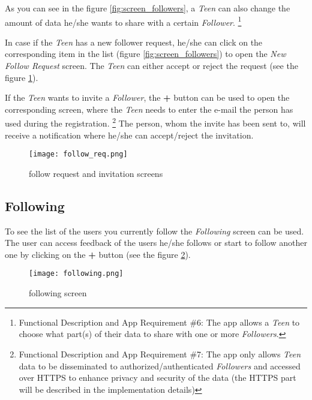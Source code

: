\documentclass{article}
\begin{document}
    As you can see in the figure \ref{fig:screen_followers}, a \emph{Teen} can also change the amount of data he/she wants to share with a certain \emph{Follower}.
    \footnote{Functional Description and App Requirement \#6: The app allows a \emph{Teen} to choose what part(s) of their data to share with one or more \emph{Followers}.}

\newpage

In case if the \emph{Teen} has a new follower request, he/she can click on the corresponding item in the list (figure \ref{fig:screen_followers}) to open the \emph{New Follow Request} screen. The \emph{Teen} can  either accept or reject the request (see the figure \ref{fig:screen_follow_req}).
    
    If the \emph{Teen} wants to invite a \emph{Follower}, the \textbf{+} button can be used to open the corresponding screen, where the \emph{Teen} needs to enter the e-mail the person has used during the registration.
    \footnote{Functional Description and App Requirement \#7: The app only allows \emph{Teen} data to be disseminated to authorized/authenticated \emph{Followers} and accessed over HTTPS to enhance privacy and security of the data (the HTTPS part will be described in the implementation details)}
    The person, whom the invite has been sent to, will receive a notification where he/she can accept/reject the invitation.

    \begin{figure}[h]
        \centering
        \texttt{[image: follow\_req.png]}
        \caption{follow request and invitation screens}
        \label{fig:screen_follow_req}
    \end{figure}

\newpage

    \subsection{Following}

    To see the list of the users you currently follow the \emph{Following} screen can be used. The user can access feedback of the users he/she follows or start to follow another one by clicking on the \textbf{+} button (see the figure \ref{fig:screen_following}).

    \begin{figure}[h]
        \centering
        \texttt{[image: following.png]}
        \caption{following screen}
        \label{fig:screen_following}
    \end{figure}
\end{document}
